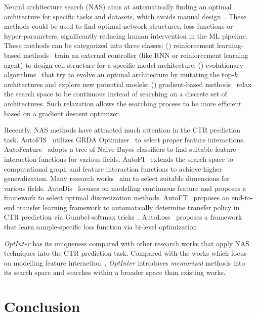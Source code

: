 \documentclass[conference]{IEEEtran}
\begin{document}
Neural architecture search (NAS) aims at automatically finding an optimal architecture for specific tasks and datasets, which avoids manual design~\cite{MetaQNN,NAS,DARTS,NAO,Large-Scale-Evolution,Regularized-Evolution}. These methods could be used to find optimal network structures, loss functions or hyper-parameters, significantly reducing human intervention in the ML pipeline. These methods can be categorized into three classes: () reinforcement learning-based methods~\cite{MetaQNN,NAS} train an external controller (like RNN or reinforcement learning agent) to design cell structure for a specific model architecture; () evolutionary algorithms~\cite{Large-Scale-Evolution,Regularized-Evolution} that try to evolve an optimal architecture by mutating the top-$k$ architectures and explore new potential models; () gradient-based methods~\cite{NAO,DARTS} relax the search space to be continuous instead of searching on a discrete set of architectures. Such relaxation allows the searching process to be more efficient based on a gradient descent optimizer.

Recently, NAS methods have attracted much attention in the CTR prediction task. AutoFIS~\cite{AutoFis} utilizes GRDA Optimizer~\cite{GRDA} to select proper feature interactions. AutoFeature~\cite{AutoFeature} adopts a tree of Naive Bayes classifiers to find suitable feature interaction functions for various fields. AutoPI~\cite{AutoPI} extends the search space to computational graph and feature interaction functions to achieve higher generalization. Many research works~\cite{AutoDim,AutoEmb,ESAPN} aim to select suitable dimensions for various fields. AutoDis~\cite{AutoDis} focuses on modelling continuous feature and proposes a framework to select optimal discretization methods. AutoFT~\cite{AutoFT} proposes an end-to-end transfer learning framework to automatically determine transfer policy in CTR prediction via Gumbel-softmax tricks~\cite{Gumbel-Softmax}. AutoLoss~\cite{AutoLoss} proposes a framework that learn sample-specific loss function via bi-level optimization. 

\textit{OptInter} has its uniqueness compared with other research works that apply NAS techniques into the CTR prediction task. 
Compared with the works which focus on modelling feature interaction~\cite{AutoFis,AutoFeature,AutoPI}, \textit{OptInter} introduces \emph{memorized} methods into its search space and searches within a broader space than existing works. 

 \section{Conclusion}
\end{document}
